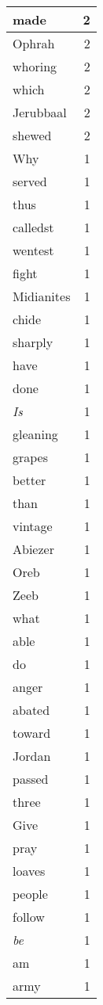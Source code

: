 \begin{center}
\begin{longtable}{l|r}
made & 2\\ \hline 
Ophrah & 2\\ \hline 
whoring & 2\\ \hline 
which & 2\\ \hline 
Jerubbaal & 2\\ \hline 
shewed & 2\\ \hline 
Why & 1\\ \hline 
served & 1\\ \hline 
thus & 1\\ \hline 
calledst & 1\\ \hline 
wentest & 1\\ \hline 
fight & 1\\ \hline 
Midianites & 1\\ \hline 
chide & 1\\ \hline 
sharply & 1\\ \hline 
have & 1\\ \hline 
done & 1\\ \hline 
\emph{Is} & 1\\ \hline 
gleaning & 1\\ \hline 
grapes & 1\\ \hline 
better & 1\\ \hline 
than & 1\\ \hline 
vintage & 1\\ \hline 
Abiezer & 1\\ \hline 
Oreb & 1\\ \hline 
Zeeb & 1\\ \hline 
what & 1\\ \hline 
able & 1\\ \hline 
do & 1\\ \hline 
anger & 1\\ \hline 
abated & 1\\ \hline 
toward & 1\\ \hline 
Jordan & 1\\ \hline 
passed & 1\\ \hline 
three & 1\\ \hline 
Give & 1\\ \hline 
pray & 1\\ \hline 
loaves & 1\\ \hline 
people & 1\\ \hline 
follow & 1\\ \hline 
\emph{be} & 1\\ \hline 
am & 1\\ \hline 
army & 1\\ \hline 

\end{longtable}
\end{center}
